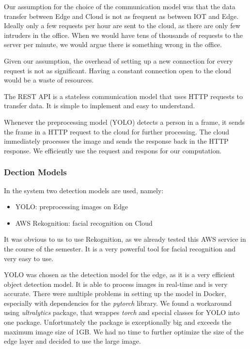\documentclass[conference]{IEEEtran}
\begin{document}
Our assumption for the choice of the communication model was that the data transfer between Edge and Cloud is not as frequent as between IOT and Edge. Ideally only a few requests per hour are sent to the cloud, as there are only few intruders in the office. When we would have tens of thousands of requests to the server per minute, we would argue there is something wrong in the office. 

Given our assumption, the overhead of setting up a new connection for every request is not as significant. Having a constant connection open to the cloud would be a waste of resources. 

The REST API is a stateless communication model that uses HTTP requests to transfer data. It is simple to implement and easy to understand. 

Whenever the preprocessing model (YOLO) detects a person in a frame, it sends the frame in a HTTP request to the cloud for further processing. 
The cloud immediately processes the image and sends the response back in the HTTP response. We efficiently use the request and respons for our computation. 
\hfill \break

\subsubsection{Dection Models}
In the system two detection models are used, namely: 
\begin{itemize}
\item YOLO: preprocessing images on Edge
\item AWS Rekognition: facial recognition on Cloud
\end{itemize}

\hfill \break

It was obvious to us to use Rekognition, as we already tested this AWS service in the course of the semester. It is a very powerful tool for facial recognition and very easy to use. 

YOLO was chosen as the detection model for the edge, as it is a very efficient object detection model. It is able to process images in real-time and is very accurate. There were multiple problems in setting up the model in Docker, especially with dependencies for the \textit{pytorch} library. We found a workaround using \textit{ultralytics} package, that wrappes \textit{torch} and special classes for YOLO into one package. Unfortunately the package is exceptionally big and exceeds the maximum image size of 1GB. We had no time to further optimize the size of the edge layer and decided to use the large image. 
\end{document}

